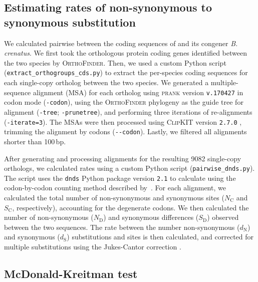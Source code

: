 \subsection*{Estimating rates of non-synonymous to synonymous substitution}

We calculated pairwise \dnds{} between the coding sequences of \bgla{} and its
congener \textit{B. crenatus}. We first took the orthologous protein coding genes
identified between the two species by \textsc{OrthoFinder}.
Then, we used a custom Python script (\texttt{extract\_orthogroups\_cds.py}) to
extract the per-species coding sequences for each single-copy ortholog between the
two species.
We generated a multiple-sequence alignment (MSA) for each ortholog using
\textsc{prank} version \texttt{v.170427} \citep{loytynoja2005_prank} in codon
mode (\texttt{-codon}), using the \textsc{OrthoFinder} phylogeny as the guide
tree for alignment (\texttt{-tree}; \texttt{-prunetree}), and performing three
iterations of re-alignments (\texttt{-iterate=3}).
The MSAs were then processed using \textsc{ClipKIT} version \texttt{2.7.0}
\citep{steenwyk2020_clipkit}, trimming the alignment by codons (\texttt{-{}-codon}).
Lastly, we filtered all alignments shorter than 100\,bp.
\vspace{0.1cm}

After generating and processing alignments for the resulting \num{9082} single-copy
orthologs, we calculated \dnds{} rates using a custom Python script
(\texttt{pairwise\_dnds.py}).
The script uses the \texttt{dnds} Python package version \texttt{2.1}
\citep{qalieh_dnds} to calculate \dnds{} using the codon-by-codon
counting method described by~\citet{nei1986_dnds}.
For each alignment, we calculated the total number of non-synonymous and
synonymous sites ($N_\text{C}$ and $S_\text{C}$, respectively),
accounting for the degenerate codons.
We then calculated the number of non-synonymous ($N_\text{D}$) and
synonymous differences ($S_\text{D}$) observed between the two sequences.
The rate between the number non-synonymous ($d_\text{N}$) and synonymous
($d_\text{S}$) substitutions and sites is then calculated, and corrected for
multiple substitutions using the Jukes-Cantor correction \citep{JC69}.

\subsection*{McDonald-Kreitman test}\label{sec:methods_mkt}

